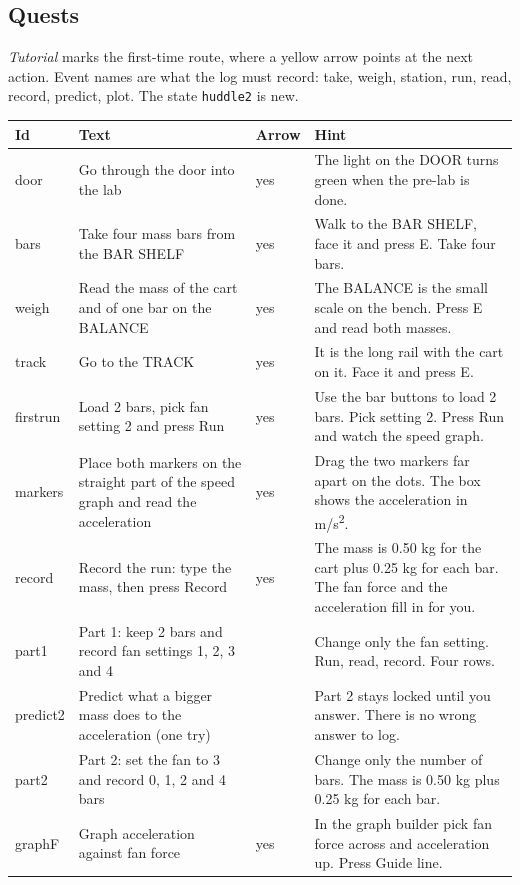 \documentclass[10pt]{article}
\begin{document}
\subsection{Quests}
\textit{Tutorial} marks the first-time route, where a yellow arrow points at the next action. Event names are what the log must record: take, weigh, station, run, read, record, predict, plot. The state \texttt{huddle2} is new.
\begin{longtable}{@{}p{0.75in} p{2.2in} p{0.5in} p{3.0in}@{}}\toprule \textbf{Id} & \textbf{Text} & \textbf{Arrow} & \textbf{Hint}\\\midrule\endhead
door & Go through the door into the lab & yes & The light on the DOOR turns green when the pre-lab is done. \\
bars & Take four mass bars from the BAR SHELF & yes & Walk to the BAR SHELF, face it and press E. Take four bars. \\
weigh & Read the mass of the cart and of one bar on the BALANCE & yes & The BALANCE is the small scale on the bench. Press E and read both masses. \\
track & Go to the TRACK & yes & It is the long rail with the cart on it. Face it and press E. \\
firstrun & Load 2 bars, pick fan setting 2 and press Run & yes & Use the bar buttons to load 2 bars. Pick setting 2. Press Run and watch the speed graph. \\
markers & Place both markers on the straight part of the speed graph and read the acceleration & yes & Drag the two markers far apart on the dots. The box shows the acceleration in m/s\textsuperscript{2}. \\
record & Record the run: type the mass, then press Record & yes & The mass is 0.50 kg for the cart plus 0.25 kg for each bar. The fan force and the acceleration fill in for you. \\
part1 & Part 1: keep 2 bars and record fan settings 1, 2, 3 and 4 &  & Change only the fan setting. Run, read, record. Four rows. \\
predict2 & Predict what a bigger mass does to the acceleration (one try) &  & Part 2 stays locked until you answer. There is no wrong answer to log. \\
part2 & Part 2: set the fan to 3 and record 0, 1, 2 and 4 bars &  & Change only the number of bars. The mass is 0.50 kg plus 0.25 kg for each bar. \\
graphF & Graph acceleration against fan force & yes & In the graph builder pick fan force across and acceleration up. Press Guide line. \\

\end{longtable}
\end{document}
